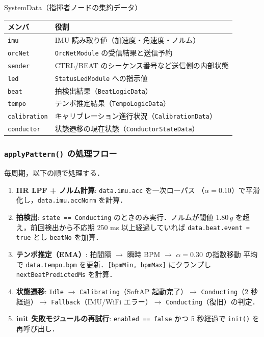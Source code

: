\documentclass[lualatex,book,paper=a4paper,jafontsize=11.5pt,jafontscale=1.05]{jlreq}
\begin{document}
\begin{apibox}{SystemData（指揮者ノードの集約データ）}
\begin{tabular}{l p{}}
\toprule
\textbf{メンバ} & \textbf{役割} \\
\midrule
\texttt{imu}         & IMU 読み取り値（加速度・角速度・ノルム） \\
\texttt{orcNet}      & \texttt{OrcNetModule} の受信結果と送信予約 \\
\texttt{sender}      & CTRL/BEAT のシーケンス番号など送信側の内部状態 \\
\texttt{led}         & \texttt{StatusLedModule} への指示値 \\
\texttt{beat}        & 拍検出結果（\texttt{BeatLogicData}） \\
\texttt{tempo}       & テンポ推定結果（\texttt{TempoLogicData}） \\
\texttt{calibration} & キャリブレーション進行状況（\texttt{CalibrationData}） \\
\texttt{conductor}   & 状態遷移の現在状態（\texttt{ConductorStateData}） \\
\bottomrule
\end{tabular}
\end{apibox}

\subsubsection{\texttt{applyPattern()} の処理フロー}

毎周期，以下の順で処理する．

\begin{enumerate}
  \item \textbf{IIR LPF + ノルム計算}: \texttt{data.imu.acc} を一次ローパス
        （$\alpha = 0.10$）で平滑化し，\texttt{data.imu.accNorm} を計算．
  \item \textbf{拍検出}: \texttt{state == Conducting} のときのみ実行．ノルムが閾値
        $1.80\,g$ を超え，前回検出から不応期 250 ms 以上経過していれば
        \texttt{data.beat.event = true} とし \texttt{beatNo} を加算．
  \item \textbf{テンポ推定（EMA）}: 拍間隔 $\to$ 瞬時 BPM $\to$ $\alpha = 0.30$ の指数移動
        平均で \texttt{data.tempo.bpm} を更新．\texttt{[bpmMin, bpmMax]} にクランプし
        \texttt{nextBeatPredictedMs} を計算．
  \item \textbf{状態遷移}: \texttt{Idle} $\to$ \texttt{Calibrating}（SoftAP 起動完了）$\to$
        \texttt{Conducting}（2 秒経過）$\to$ \texttt{Fallback}（IMU/WiFi エラー）$\to$
        \texttt{Conducting}（復旧）の判定．
  \item \textbf{init 失敗モジュールの再試行}: \texttt{enabled == false} かつ 5 秒経過で
        \texttt{init()} を再呼び出し．
\end{enumerate}
\end{document}
